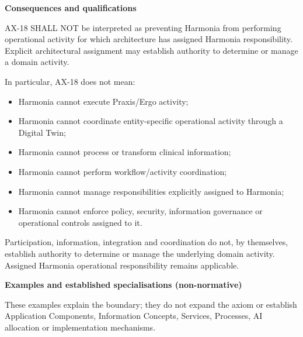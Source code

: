 \par\medskip\textbf{Consequences and qualifications}\par


AX-18 SHALL NOT be interpreted as preventing Harmonia from performing
operational activity for which architecture has assigned Harmonia
responsibility. Explicit architectural assignment may establish authority
to determine or manage a domain activity.



In particular, AX-18 does not mean:



\begin{itemize}


\item Harmonia cannot execute Praxis/Ergo activity;

\item Harmonia cannot coordinate entity-specific operational activity through a Digital Twin;

\item Harmonia cannot process or transform clinical information;

\item Harmonia cannot perform workflow/activity coordination;

\item Harmonia cannot manage responsibilities explicitly assigned to Harmonia;

\item Harmonia cannot enforce policy, security, information governance or operational controls assigned to it.

\end{itemize}


Participation, information, integration and coordination do not, by
themselves, establish authority to determine or manage the underlying domain
activity. Assigned Harmonia operational responsibility remains applicable.



\par\medskip\textbf{Examples and established specialisations (non-normative)}\par


These examples explain the boundary; they do not expand the axiom or
establish Application Components, Information Concepts, Services, Processes,
AI allocation or implementation mechanisms.



